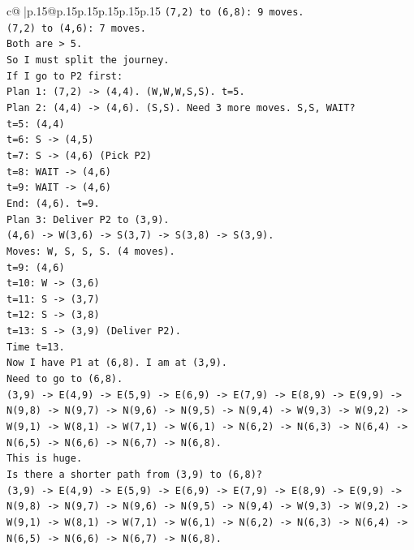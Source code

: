 \documentclass{article}
\begin{document}
{\begin{supertabular}{c@{$\;$}|p{.15\linewidth}@{}p{.15\linewidth}p{.15\linewidth}p{.15\linewidth}p{.15\linewidth}p{.15\linewidth}}
{{{\texttt{(7,2) to (6,8): 9 moves.} \\
\texttt{(7,2) to (4,6): 7 moves.} \\
\texttt{Both are > 5.} \\
\texttt{So I must split the journey.} \\
\texttt{If I go to P2 first:} \\
\texttt{Plan 1: (7,2) {-}> (4,4). (W,W,W,S,S). t=5.} \\
\texttt{Plan 2: (4,4) {-}> (4,6). (S,S). Need 3 more moves. S,S, WAIT?} \\
\texttt{t=5: (4,4)} \\
\texttt{t=6: S {-}> (4,5)} \\
\texttt{t=7: S {-}> (4,6) (Pick P2)} \\
\texttt{t=8: WAIT {-}> (4,6)} \\
\texttt{t=9: WAIT {-}> (4,6)} \\
\texttt{End: (4,6). t=9.} \\
\texttt{Plan 3: Deliver P2 to (3,9).} \\
\texttt{(4,6) {-}> W(3,6) {-}> S(3,7) {-}> S(3,8) {-}> S(3,9).} \\
\texttt{Moves: W, S, S, S. (4 moves).} \\
\texttt{t=9: (4,6)} \\
\texttt{t=10: W {-}> (3,6)} \\
\texttt{t=11: S {-}> (3,7)} \\
\texttt{t=12: S {-}> (3,8)} \\
\texttt{t=13: S {-}> (3,9) (Deliver P2).} \\
\texttt{Time t=13.} \\
\texttt{Now I have P1 at (6,8). I am at (3,9).} \\
\texttt{Need to go to (6,8).} \\
\texttt{(3,9) {-}> E(4,9) {-}> E(5,9) {-}> E(6,9) {-}> E(7,9) {-}> E(8,9) {-}> E(9,9) {-}> N(9,8) {-}> N(9,7) {-}> N(9,6) {-}> N(9,5) {-}> N(9,4) {-}> W(9,3) {-}> W(9,2) {-}> W(9,1) {-}> W(8,1) {-}> W(7,1) {-}> W(6,1) {-}> N(6,2) {-}> N(6,3) {-}> N(6,4) {-}> N(6,5) {-}> N(6,6) {-}> N(6,7) {-}> N(6,8).} \\
\texttt{This is huge.} \\
\texttt{Is there a shorter path from (3,9) to (6,8)?} \\
\texttt{(3,9) {-}> E(4,9) {-}> E(5,9) {-}> E(6,9) {-}> E(7,9) {-}> E(8,9) {-}> E(9,9) {-}> N(9,8) {-}> N(9,7) {-}> N(9,6) {-}> N(9,5) {-}> N(9,4) {-}> W(9,3) {-}> W(9,2) {-}> W(9,1) {-}> W(8,1) {-}> W(7,1) {-}> W(6,1) {-}> N(6,2) {-}> N(6,3) {-}> N(6,4) {-}> N(6,5) {-}> N(6,6) {-}> N(6,7) {-}> N(6,8).} \\
}}}
\end{supertabular}}
\end{document}
